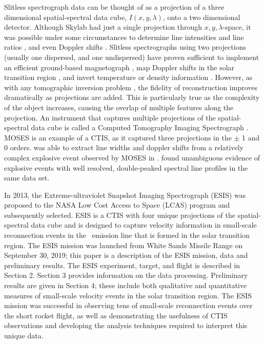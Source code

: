     Slitless spectrograph data can be thought of as a projection of a three dimensional spatial-spectral data cube, $I(x,y,\lambda)$, onto a two dimensional detector.  
    Although Skylab had just a single projection through $x,y,\lambda$-space, it was possible under some circumstances to determine line intensities and line ratios \cite[e.g.,][]{Keenan1988, Tayal1989, Keenan2006}, and even Doppler shifts \citep{MariskaDoppler1992}. 
    Slitless spectrographs using two projections (usually one dispersed, and one undispersed) have proven sufficient to implement an efficient ground-based magnetograph \citep{DeforestStereoscopy2004}, map Doppler shifts in the solar transition region \citep{Courrier2018}, and invert temperature or density information \citep{winebarger2019}. 
    However, as with any tomographic inversion problem \citep{KakSlaney2001}, the fidelity of reconstruction improves dramatically as projections are added. 
    This is particularly true as the complexity of the object increases, causing the overlap of multiple features along the projection. 
    An instrument that captures multiple projections of the spatial-spectral data cube is called a Computed Tomography Imaging Spectrograph  \cite[CTIS,][]{DescourDereniakCTIS1995}.  
    MOSES is an example of a CTIS, as it captured three projections in the $\pm$ 1 and 0 orders.  
    \cite{Fox10} was able to extract line widths and doppler shifts from a relatively complex explosive event observed by MOSES in \heii.  
    \cite{Rust2019} found unambiguous evidence of explosive events with well resolved, double-peaked spectral line profiles in the same data set.
    
    In 2013, the Extreme-ultraviolet Snapshot Imaging Spectrograph (ESIS) was proposed to the NASA Low Cost Access to Space (LCAS) program and subsequently selected.  
    ESIS is a CTIS with four unique projections of the spatial-spectral data cube and is designed to capture velocity information in small-scale reconnection events in the \ov \ emission line that is formed in the solar transition region.  
    The ESIS mission was launched from White Sands Missile Range on September 30,  2019; this paper is a description of the ESIS mission, data and preliminary results.  
    The ESIS experiment, target, and flight is described in Section 2.  
    Section 3 provides information on the data processing.  Preliminary results are given in Section 4; these include both qualitative and quantitative measures of small-scale velocity events in the solar transition region.  The ESIS mission was successful in  observing tens of small-scale reconnection events over the short rocket flight, as well as demonstrating the usefulness of CTIS observations and developing the analysis techniques required to interpret this unique data.


